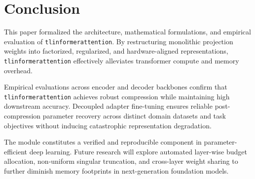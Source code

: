 \section{Conclusion}
This paper formalized the architecture, mathematical formulations, and empirical evaluation of \texttt{tlinformerattention}. By restructuring monolithic projection weights into factorized, regularized, and hardware-aligned representations, \texttt{tlinformerattention} effectively alleviates transformer compute and memory overhead.

Empirical evaluations across encoder and decoder backbones confirm that \texttt{tlinformerattention} achieves robust compression while maintaining high downstream accuracy. Decoupled adapter fine-tuning ensures reliable post-compression parameter recovery across distinct domain datasets and task objectives without inducing catastrophic representation degradation.

The module constitutes a verified and reproducible component in parameter-efficient deep learning. Future research will explore automated layer-wise budget allocation, non-uniform singular truncation, and cross-layer weight sharing to further diminish memory footprints in next-generation foundation models.

